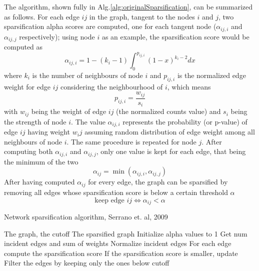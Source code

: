 The algorithm, shown fully in Alg.\ref{alg:originalSparsification}, can be summarized as follows. For each edge $ij$ in the graph, tangent to the nodes $i$ and $j$, two sparsification alpha scores are computed, one for each tangent node ($\alpha_{ij,i}$ and $\alpha_{ij,j}$ respectively); using node $i$ as an example, the sparsification score would be computed as
$$\alpha_{ij,i} = 1 - (k_i-1) \int_0^{p_{ij,i}}(1-x)^{k_i-2}dx$$
where $k_i$ is the number of neighbours of node $i$ and $p_{ij,i}$ is the normalized edge weight for edge $ij$ considering the neighbourhood of $i$, which means 
$$p_{ij,i} = \frac{w_{ij}}{s_i}$$ 
with $w_{ij}$ being the weight of edge $ij$ (the normalized counts value) and $s_i$ being the strength of node $i$. The value $\alpha_{ij,i}$ represents the probability (or p-value) of edge $ij$ having weight $w_ij$ assuming random distribution of edge weight among all neighbours of node $i$.
The same procedure is repeated for node $j$.
After computing both $\alpha_{ij,i}$ and $\alpha_{ij,j}$, only one value is kept for each edge, that being the minimum of the two
$$\alpha_{ij} = \min(\alpha_{ij,i}, \alpha_{ij,j})$$
After having computed $\alpha_{ij}$ for every edge, the graph can be sparsified by removing all edges whose sparsification score is below a certain threshold $\alpha$
$$\text{keep edge } ij \iff \alpha_{ij} < \alpha$$

\begin{algorithm}
\caption{Network sparsification algorithm, Serrano et. al, 2009}\label{alg:originalSparsification}
\begin{algorithmic}[1]
\Require The graph, the cutoff
\Ensure The sparsified graph
\State Initialize alpha values to 1
    \State Get num incident edges and sum of weights
    \State Normalize incident edges 
    \State For each edge compute the sparsification score
    \State If the sparsification score is smaller, update
\EndFor
\State Filter the edges by keeping only the ones below cutoff
\end{algorithmic}
\end{algorithm}

